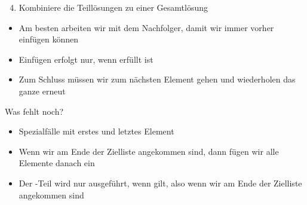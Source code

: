 \documentclass{../tuda-beamer}
\begin{document}
    \begin{frame}
        \begin{enumerate}
            \setcounter{enumi}{3}
            \item Kombiniere die Teillösungen zu einer Gesamtlösung
        \end{enumerate}

        \begin{itemize}
            \item Am besten arbeiten wir mit dem Nachfolger, damit wir immer vorher einfügen können
            \item Einfügen erfolgt nur, wenn  erfüllt ist
        \end{itemize}
    \end{frame}

    \begin{frame}
        
    \end{frame}

    \begin{frame}
        \begin{itemize}
            \item Zum Schluss müssen wir zum nächsten Element gehen und wiederholen das ganze erneut
        \end{itemize}

        
    \end{frame}

    \begin{frame}{Was fehlt noch?}
        \begin{itemize}
            \item Spezialfälle mit erstes und letztes Element
            \item Wenn wir am Ende der Zielliste angekommen sind, dann fügen wir alle Elemente
            danach ein
            \item Der -Teil wird nur ausgeführt, wenn  gilt, also wenn wir am Ende der Zielliste angekommen sind
        \end{itemize}

        
    \end{frame}

    \begin{frame}[allowframebreaks, c]
        
    \end{frame}
\end{document}
